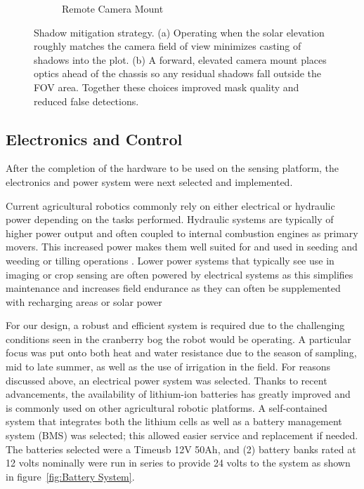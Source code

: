 \begin{figure}[!ht]
\begin{subfigure}[b]{0.4\textwidth}
    \caption{Remote Camera Mount}
    \label{fig:CamMount}
  \end{subfigure}
  \caption{Shadow mitigation strategy. (a) Operating when the solar elevation roughly matches the camera field of view minimizes casting of shadows into the plot. (b) A forward, elevated camera mount places optics ahead of the chassis so any residual shadows fall outside the FOV area. Together these choices improved mask quality and reduced false detections.}

  \label{fig:ShadowMit}
\end{figure}


\subsection{Electronics and Control}

After the completion of the hardware to be used on the sensing platform, the electronics and power system were next selected and implemented.

Current agricultural robotics commonly rely on either electrical or hydraulic power depending on the tasks performed. Hydraulic systems are typically of higher power output and often coupled to internal combustion engines as primary movers. This increased power makes them well suited for and used in seeding and weeding or tilling operations \cite{vahdanjoo_operational_2023}. Lower power systems that typically see use in imaging or crop sensing are often powered by electrical systems as this simplifies maintenance and increases field endurance as they can often be supplemented with recharging areas or solar power \cite{quaglia_design_2020}

For our design, a robust and efficient system is required due to the challenging conditions seen in the cranberry bog the robot would be operating. A particular focus was put onto both heat and water resistance due to the season of sampling, mid to late summer, as well as the use of irrigation in the field. For reasons discussed above, an electrical power system was selected. Thanks to recent advancements, the availability of lithium-ion batteries has greatly improved and is commonly used on other agricultural robotic platforms. \cite{ghobadpour_off-road_2022} A self-contained system that integrates both the lithium cells as well as a battery management system (BMS) was selected; this allowed easier service and replacement if needed. The batteries selected were a Timeusb 12V 50Ah, and (2) battery banks rated at 12 volts nominally were run in series to provide 24 volts to the system as shown in figure~\ref{fig:Battery System}. 

